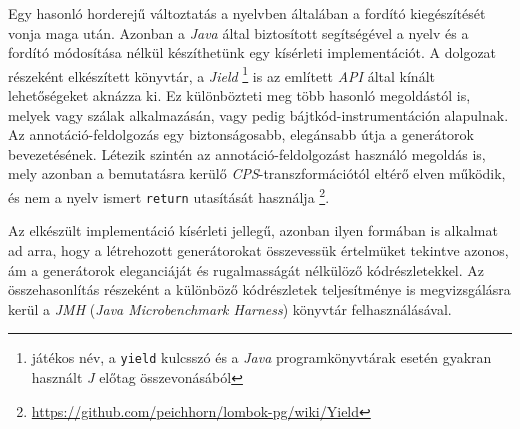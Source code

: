 Egy hasonló horderejű változtatás a nyelvben általában a fordító kiegészítését vonja maga után. Azonban a \textit{Java} által biztosított  segítségével a nyelv és a fordító módosítása nélkül készíthetünk egy kísérleti implementációt. A dolgozat részeként elkészített könyvtár, a \textit{Jield} \footnote{játékos név, a \texttt{yield} kulcsszó és a \textit{Java} programkönyvtárak esetén gyakran használt \textit{J} előtag összevonásából} is az említett \textit{API} által kínált lehetőségeket aknázza ki. Ez különbözteti meg több hasonló megoldástól is, melyek vagy szálak alkalmazásán, vagy pedig bájtkód-instrumentáción alapulnak. Az annotáció-feldolgozás egy biztonságosabb, elegánsabb útja a generátorok bevezetésének. Létezik szintén az annotáció-feldolgozást használó megoldás is, mely azonban a bemutatásra kerülő \textit{CPS}-transzformációtól eltérő elven működik, és nem a nyelv ismert \texttt{return} utasítását használja \footnote{\url{https://github.com/peichhorn/lombok-pg/wiki/Yield}}.

Az elkészült implementáció kísérleti jellegű, azonban ilyen formában is alkalmat ad arra, hogy a létrehozott generátorokat összevessük értelmüket tekintve azonos, ám a generátorok eleganciáját és rugalmasságát nélkülöző kódrészletekkel. Az összehasonlítás részeként a különböző kódrészletek teljesítménye is megvizsgálásra kerül a \textit{JMH} (\textit{Java Microbenchmark Harness}) könyvtár felhasználásával.
